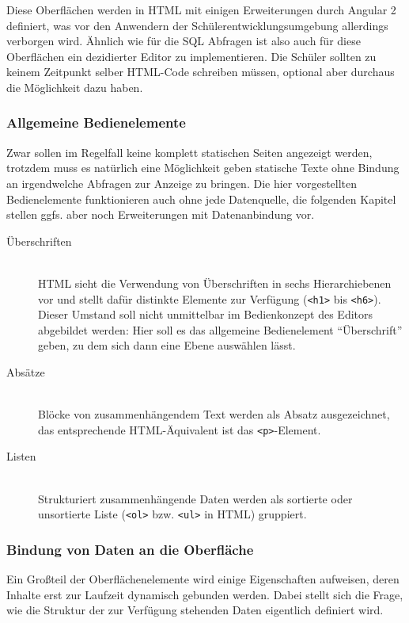 Diese Oberflächen werden in HTML mit einigen Erweiterungen durch Angular 2 definiert, was vor den Anwendern der Schülerentwicklungsumgebung allerdings verborgen wird. Ähnlich wie für die SQL Abfragen ist also auch für diese Oberflächen ein dezidierter Editor zu implementieren. Die Schüler sollten zu keinem Zeitpunkt selber HTML-Code schreiben müssen, optional aber durchaus die Möglichkeit dazu haben.

\subsubsection{Allgemeine Bedienelemente}

Zwar sollen im Regelfall keine komplett statischen Seiten angezeigt werden, trotzdem muss es natürlich eine Möglichkeit geben statische Texte ohne Bindung an irgendwelche Abfragen zur Anzeige zu bringen. Die hier vorgestellten Bedienelemente funktionieren auch ohne jede Datenquelle, die folgenden Kapitel stellen ggfs. aber noch Erweiterungen mit Datenanbindung vor.

\begin{description}
  \item[Überschriften] \hfill \\
    HTML sieht die Verwendung von Überschriften in sechs Hierarchiebenen vor und stellt dafür distinkte Elemente zur Verfügung (\texttt{<h1>} bis \texttt{<h6>}). Dieser Umstand soll nicht unmittelbar im Bedienkonzept des Editors abgebildet werden: Hier soll es das allgemeine Bedienelement ``Überschrift'' geben, zu dem sich dann eine Ebene auswählen lässt.
  \item[Absätze] \hfill \\
    Blöcke von zusammenhängendem Text werden als Absatz ausgezeichnet, das entsprechende HTML-Äquivalent ist das \texttt{<p>}-Element.
  \item[Listen] \hfill \\
    Strukturiert zusammenhängende Daten werden als sortierte oder unsortierte Liste (\texttt{<ol>} bzw. \texttt{<ul>} in HTML) gruppiert.
      
\end{description}

\subsubsection{Bindung von Daten an die Oberfläche}

Ein Großteil der Oberflächenelemente wird einige Eigenschaften aufweisen, deren Inhalte erst zur Laufzeit dynamisch gebunden werden. Dabei stellt sich die Frage, wie die Struktur der zur Verfügung stehenden Daten eigentlich definiert wird.

